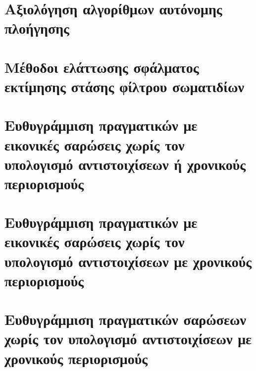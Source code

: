 \chapter{Αξιολόγηση αλγορίθμων αυτόνομης πλοήγησης}
  \label{part:02:chapter:01}
  

\chapter{Μέθοδοι ελάττωσης σφάλματος εκτίμησης στάσης φίλτρου σωματιδίων}
  \label{part:02:chapter:02}
  

\chapter{Ευθυγράμμιση πραγματικών με εικονικές σαρώσεις χωρίς τον υπολογισμό αντιστοιχίσεων ή χρονικούς περιορισμούς}
  \label{part:02:chapter:03}
  

\chapter{Ευθυγράμμιση πραγματικών με εικονικές σαρώσεις χωρίς τον υπολογισμό αντιστοιχίσεων με χρονικούς περιορισμούς}
  \label{part:02:chapter:04}
  

\chapter{Ευθυγράμμιση πραγματικών σαρώσεων χωρίς τον υπολογισμό αντιστοιχίσεων με χρονικούς περιορισμούς}
  \label{part:02:chapter:05}
  
